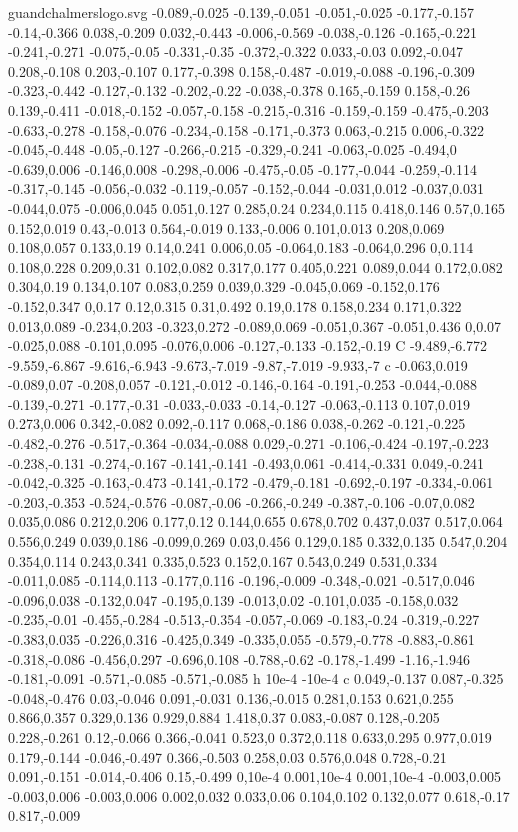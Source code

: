 \begin{filecontents}[noheader]{guandchalmerslogo.svg}
-0.089,-0.025 -0.139,-0.051 -0.051,-0.025 -0.177,-0.157 -0.14,-0.366 0.038,-0.209 0.032,-0.443 -0.006,-0.569 -0.038,-0.126 -0.165,-0.221 -0.241,-0.271 -0.075,-0.05 -0.331,-0.35 -0.372,-0.322 0.033,-0.03 0.092,-0.047 0.208,-0.108 0.203,-0.107 0.177,-0.398 0.158,-0.487 -0.019,-0.088 -0.196,-0.309 -0.323,-0.442 -0.127,-0.132 -0.202,-0.22 -0.038,-0.378 0.165,-0.159 0.158,-0.26 0.139,-0.411 -0.018,-0.152 -0.057,-0.158 -0.215,-0.316 -0.159,-0.159 -0.475,-0.203 -0.633,-0.278 -0.158,-0.076 -0.234,-0.158 -0.171,-0.373 0.063,-0.215 0.006,-0.322 -0.045,-0.448 -0.05,-0.127 -0.266,-0.215 -0.329,-0.241 -0.063,-0.025 -0.494,0 -0.639,0.006 -0.146,0.008 -0.298,-0.006 -0.475,-0.05 -0.177,-0.044 -0.259,-0.114 -0.317,-0.145 -0.056,-0.032 -0.119,-0.057 -0.152,-0.044 -0.031,0.012 -0.037,0.031 -0.044,0.075 -0.006,0.045 0.051,0.127 0.285,0.24 0.234,0.115 0.418,0.146 0.57,0.165 0.152,0.019 0.43,-0.013 0.564,-0.019 0.133,-0.006 0.101,0.013 0.208,0.069 0.108,0.057 0.133,0.19 0.14,0.241 0.006,0.05 -0.064,0.183 -0.064,0.296 0,0.114 0.108,0.228 0.209,0.31 0.102,0.082 0.317,0.177 0.405,0.221 0.089,0.044 0.172,0.082 0.304,0.19 0.134,0.107 0.083,0.259 0.039,0.329 -0.045,0.069 -0.152,0.176 -0.152,0.347 0,0.17 0.12,0.315 0.31,0.492 0.19,0.178 0.158,0.234 0.171,0.322 0.013,0.089 -0.234,0.203 -0.323,0.272 -0.089,0.069 -0.051,0.367 -0.051,0.436 0,0.07 -0.025,0.088 -0.101,0.095 -0.076,0.006 -0.127,-0.133 -0.152,-0.19 C -9.489,-6.772 -9.559,-6.867 -9.616,-6.943 -9.673,-7.019 -9.87,-7.019 -9.933,-7 c -0.063,0.019 -0.089,0.07 -0.208,0.057 -0.121,-0.012 -0.146,-0.164 -0.191,-0.253 -0.044,-0.088 -0.139,-0.271 -0.177,-0.31 -0.033,-0.033 -0.14,-0.127 -0.063,-0.113 0.107,0.019 0.273,0.006 0.342,-0.082 0.092,-0.117 0.068,-0.186 0.038,-0.262 -0.121,-0.225 -0.482,-0.276 -0.517,-0.364 -0.034,-0.088 0.029,-0.271 -0.106,-0.424 -0.197,-0.223 -0.238,-0.131 -0.274,-0.167 -0.141,-0.141 -0.493,0.061 -0.414,-0.331 0.049,-0.241 -0.042,-0.325 -0.163,-0.473 -0.141,-0.172 -0.479,-0.181 -0.692,-0.197 -0.334,-0.061 -0.203,-0.353 -0.524,-0.576 -0.087,-0.06 -0.266,-0.249 -0.387,-0.106 -0.07,0.082 0.035,0.086 0.212,0.206 0.177,0.12 0.144,0.655 0.678,0.702 0.437,0.037 0.517,0.064 0.556,0.249 0.039,0.186 -0.099,0.269 0.03,0.456 0.129,0.185 0.332,0.135 0.547,0.204 0.354,0.114 0.243,0.341 0.335,0.523 0.152,0.167 0.543,0.249 0.531,0.334 -0.011,0.085 -0.114,0.113 -0.177,0.116 -0.196,-0.009 -0.348,-0.021 -0.517,0.046 -0.096,0.038 -0.132,0.047 -0.195,0.139 -0.013,0.02 -0.101,0.035 -0.158,0.032 -0.235,-0.01 -0.455,-0.284 -0.513,-0.354 -0.057,-0.069 -0.183,-0.24 -0.319,-0.227 -0.383,0.035 -0.226,0.316 -0.425,0.349 -0.335,0.055 -0.579,-0.778 -0.883,-0.861 -0.318,-0.086 -0.456,0.297 -0.696,0.108 -0.788,-0.62 -0.178,-1.499 -1.16,-1.946 -0.181,-0.091 -0.571,-0.085 -0.571,-0.085 h 10e-4 -10e-4 c 0.049,-0.137 0.087,-0.325 -0.048,-0.476 0.03,-0.046 0.091,-0.031 0.136,-0.015 0.281,0.153 0.621,0.255 0.866,0.357 0.329,0.136 0.929,0.884 1.418,0.37 0.083,-0.087 0.128,-0.205 0.228,-0.261 0.12,-0.066 0.366,-0.041 0.523,0 0.372,0.118 0.633,0.295 0.977,0.019 0.179,-0.144 -0.046,-0.497 0.366,-0.503 0.258,0.03 0.576,0.048 0.728,-0.21 0.091,-0.151 -0.014,-0.406 0.15,-0.499 0,10e-4 0.001,10e-4 0.001,10e-4 -0.003,0.005 -0.003,0.006 -0.003,0.006 0.002,0.032 0.033,0.06 0.104,0.102 0.132,0.077 0.618,-0.17 0.817,-0.009 
\end{filecontents}

